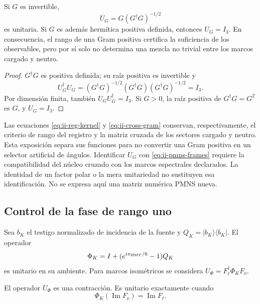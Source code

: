 \begin{proposition}
Si \(G\) es invertible,
\begin{equation}
 U_G=G(G^\dagger G)^{-1/2}
 \label{eq:ii-polar}
\end{equation}
es unitaria. Si \(G\) es además hermítica positiva definida, entonces
\(U_G=I_3\). En consecuencia, el rango de una Gram positiva certifica
la suficiencia de los observables, pero por sí solo no determina una
mezcla no trivial entre los marcos cargado y neutro.
\end{proposition}

\begin{proof}
\(G^\dagger G\) es positiva definida; su raíz positiva es invertible y
\[
 U_G^\dagger U_G=(G^\dagger G)^{-1/2}(G^\dagger G)
 (G^\dagger G)^{-1/2}=I_3.
\]
Por dimensión finita, también
\(U_GU_G^\dagger=I_3\). Si \(G>0\), la raíz positiva de
\(G^\dagger G=G^2\) es \(G\), y \(U_G=I_3\).
\end{proof}

\begin{remark}
Las ecuaciones \eqref{eq:ii-reg-kernel} y \eqref{eq:ii-cross-gram}
conservan, respectivamente, el criterio de rango del registro y
la matriz cruzada de los sectores cargado y neutro. Esta exposición
separa sus funciones para no convertir una Gram positiva en un selector
artificial de ángulos. Identificar \(U_G\) con
\eqref{eq:ii-pmns-frames} requiere la compatibilidad del núcleo cruzado
con los marcos espectrales declarados. La identidad de un factor polar
o la mera unitariedad no sustituyen esa identificación. No se expresa
aquí una matriz numérica PMNS nueva.
\end{remark}

\subsection{Control de la fase de rango uno}

Sea \(b_K\) el testigo normalizado de incidencia de la fuente y
\(Q_K=|b_K\rangle\langle b_K|\). El operador
\begin{equation}
 \Phi_K=I+(e^{i\pi_{\rm HMT}/6}-1)Q_K
 \label{eq:ii-rank-one-phase}
\end{equation}
es unitario en su ambiente. Para marcos isométricos se considera
\(U_\Phi=F_\ell^\dagger\Phi_KF_\nu\).

\begin{proposition}
El operador \(U_\Phi\) es una contracción. Es unitario exactamente
cuando
\begin{equation}
 \Phi_K(\operatorname{Im}F_\nu)=\operatorname{Im}F_\ell.
 \label{eq:ii-phase-compatibility}
\end{equation}
\end{proposition}

